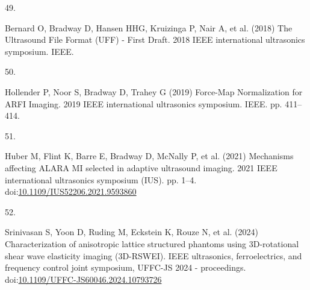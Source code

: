 \documentclass[
]{article}
\newlength{\cslhangindent}
\newlength{\csllabelwidth}
\newenvironment{CSLReferences}[2] %
 {\begin{list}{}{%
  \setlength{\itemindent}{0pt}
  \setlength{\leftmargin}{0pt}
  \setlength{\parsep}{0pt}
  \ifodd #1
   \setlength{\leftmargin}{\cslhangindent}
   \setlength{\itemindent}{-1\cslhangindent}
  \fi
  \setlength{\itemsep}{#2\baselineskip}}}
 {\end{list}}
\newcommand{\CSLLeftMargin}[1]{\parbox[t]{\csllabelwidth}{\strut#1\strut}}
\newcommand{\CSLRightInline}[1]{\parbox[t]{\linewidth - \csllabelwidth}{\strut#1\strut}}
\begin{document}
\begin{CSLReferences}{0}{1}
\CSLLeftMargin{49. }%
\CSLRightInline{Bernard O, Bradway D, Hansen HHG, Kruizinga P, Nair A,
et al. (2018) {The Ultrasound File Format (UFF) - First Draft}. 2018
IEEE international ultrasonics symposium. IEEE.}

\CSLLeftMargin{50. }%
\CSLRightInline{Hollender P, Noor S, Bradway D, Trahey G (2019)
{Force-Map Normalization for ARFI Imaging}. 2019 IEEE international
ultrasonics symposium. IEEE. pp. 411--414.}

\CSLLeftMargin{51. }%
\CSLRightInline{Huber M, Flint K, Barre E, Bradway D, McNally P, et al.
(2021) Mechanisms affecting ALARA MI selected in adaptive ultrasound
imaging. 2021 IEEE international ultrasonics symposium (IUS). pp. 1--4.
doi:\href{https://doi.org/10.1109/IUS52206.2021.9593860}{10.1109/IUS52206.2021.9593860}}

\CSLLeftMargin{52. }%
\CSLRightInline{Srinivasan S, Yoon D, Ruding M, Eckstein K, Rouze N, et
al. (2024) Characterization of anisotropic lattice structured phantoms
using 3D-rotational shear wave elasticity imaging (3D-RSWEI). IEEE
ultrasonics, ferroelectrics, and frequency control joint symposium,
UFFC-JS 2024 - proceedings.
doi:\href{https://doi.org/10.1109/UFFC-JS60046.2024.10793726}{10.1109/UFFC-JS60046.2024.10793726}}

\end{CSLReferences}
\end{document}
